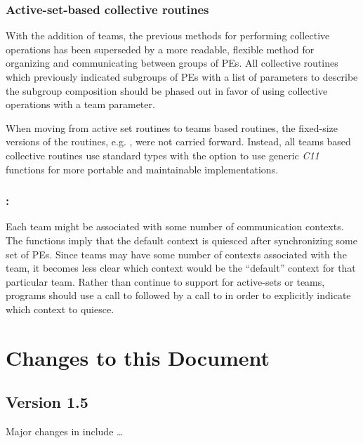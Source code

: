 \subsection{Active-set-based collective routines}
With the addition of \openshmem teams, the previous methods for performing collective
operations has been superseded by a more readable, flexible method for
organizing and communicating between groups of \acp{PE}. All collective routines
which previously indicated subgroups of \acp{PE} with a list of
parameters to describe the subgroup composition should be phased
out in favor of using collective operations with a team parameter.

When moving from active set routines to teams based routines, the fixed-size
versions of the routines, e.g. , were not
carried forward. Instead, all teams based collective routines use standard
\Cstd types with the option to use generic \textit{C11} functions for more portable
and maintainable implementations.

\subsection{\CorCpp: }
Each \openshmem team might
be associated with some number of communication contexts. The 
functions imply that the default context is quiesced after synchronizing
some set of \acp{PE}. Since teams may have some number of contexts associated
with the team, it becomes less clear which context would be the ``default'' context
for that particular team. Rather than continue to support 
for active-sets or teams, programs should use a call to 
followed by a call to  in order to explicitly
indicate which context to quiesce.

\chapter{Changes to this Document}\label{sec:changelog}

\section{Version 1.5}
Major changes in \openshmem[1.5] include \dots

